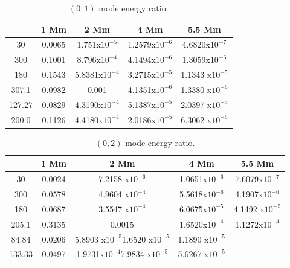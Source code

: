 \documentclass[preprint,authoryear,12pt]{elsarticle}
\begin{document}
\begin{table}[h]
\centering
\begin{tabular}{c c c c c }
\hline
   &  1 Mm & 2 Mm & 4 Mm & 5.5 Mm \\
\hline
30 &  0.0065 & 1.751x$10^{-5}$ &  1.2579x$10^{-6}$ & 4.6820x$10^{-7}$ \\
\hline
300 & 0.1001 & 8.796x$10^{-4}$ &  4.1494x$10^{-6}$ &  1.3059x$10^{-6}$ \\
\hline
180 & 0.1543 &  5.8381x$10^{-4}$ &  3.2715x$10^{-5}$ &  1.1343 x$10^{-5}$ \\
\hline
307.1 & 0.0982 & 0.001 & 4.1351x$10^{-6}$ & 1.3380 x$10^{-6}$  \\
\hline
127.27 & 0.0829 &  4.3190x$10^{-4}$ &  5.1387x$10^{-5}$ & 2.0397 x$10^{-5}$ \\ 
\hline
200.0 & 0.1126 &  4.4180x$10^{-4}$ &  2.0186x$10^{-5}$ & 6.3062 x$10^{-6}$ \\
\hline
\end{tabular} 
\caption{ $(0, 1)$ mode energy ratio.}
\label{Table01mode}
\end{table}

\begin{table}[h]
\centering
\begin{tabular}{c c c c c }
\hline
   &  1 Mm & 2 Mm & 4 Mm & 5.5 Mm \\
\hline
30 &  0.0024 & 7.2158 x$10^{-6}$ & 1.0651x$10^{-6}$ & 7.6079x$10^{-7}$\\
\hline
300 & 0.0578 & 4.9604 x$10^{-4}$ & 5.5618x$10^{-6}$ & 4.1907x$10^{-6}$\\
\hline
180 & 0.0687 & 3.5547 x$10^{-4}$ & 6.0675x$10^{-5}$ & 4.1492 x$10^{-5}$\\
\hline
205.1 & 0.3135 & 0.0015 &1.6520x$10^{-4}$ & 1.1272x$10^{-4}$\\
\hline
84.84 & 0.0206 &5.8903 x$10^{-5}$1.6520 x$10^{-5}$ & 1.1890 x$10^{-5}$\\
\hline
133.33 & 0.0497 & 1.9731x$10^{-4}$7.9834 x$10^{-5}$ & 5.6267 x$10^{-5}$\\
\hline
\end{tabular} 
\caption{ $(0, 2)$ mode energy ratio.}
\label{Table02mode}
\end{table}
\end{document}
